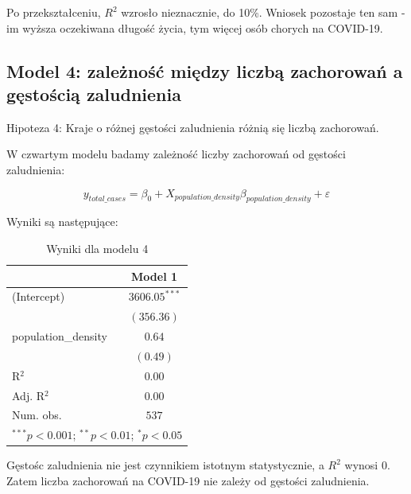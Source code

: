 \documentclass[12pt]{mwbk}
\theoremstyle{plain}
\theoremstyle{definition}
\theoremstyle{remark}
\begin{document}
	


Po przekształceniu, $R^2$ wzrosło nieznacznie, do 10\%. Wniosek pozostaje ten sam - im wyższa oczekiwana długość życia, tym więcej osób chorych na COVID-19.

\newpage

\subsection{Model 4: zależność między liczbą zachorowań a gęstością zaludnienia}

Hipoteza 4: Kraje o różnej gęstości zaludnienia różnią się liczbą zachorowań.

W czwartym modelu badamy zależność liczby zachorowań od gęstości zaludnienia:

$$y_{total\_cases}=\beta_0+X_{population\_density}\beta_{population\_density}+\varepsilon$$


Wyniki są następujące:

\begin{table}[!htbp]
	\begin{center}
		\begin{tabular}{l c}
			\hline
			& Model 1 \\
			\hline
			(Intercept)         & $3606.05^{***}$ \\
			& $(356.36)$      \\
			population\_density & $0.64$          \\
			& $(0.49)$        \\
			\hline
			R$^2$               & $0.00$          \\
			Adj. R$^2$          & $0.00$          \\
			Num. obs.           & $537$           \\
			\hline
			\multicolumn{2}{l}{\scriptsize{$^{***}p<0.001$; $^{**}p<0.01$; $^{*}p<0.05$}}
		\end{tabular}
		\caption{Wyniki dla modelu 4}
		\label{table:mod4}
	\end{center}
\end{table}

Gęstośc zaludnienia nie jest czynnikiem istotnym statystycznie, a $R^2$ wynosi 0. Zatem liczba zachorowań na COVID-19 nie zależy od gęstości zaludnienia.
\end{document}
